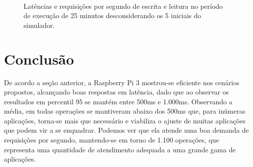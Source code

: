\documentclass[12pt,english,brazil]{article}
\begin{document}
\begin{figure}[!ht]
  \centering
  \mbox{%
    \qquad
    }
  \caption{Latências e requisições por segundo de escrita e leitura no período de execução de 25 minutos desconsiderando os 5 iniciais do simulador.}
  \label{fig:avr-memmap3}
\end{figure}

\section{Conclusão} \label{sec:conlusao}

De acordo a seção anterior, a Raspberry Pi 3 mostrou-se eficiente nos cenários propostos, alcançando boas respostas em latência, dado que ao observar os resultados em percentil 95 se mantém entre 500ms e 1.000ms. Observando a média, em todas operações se mantiveram abaixo dos 500ms que, para inúmeras aplicações, torna-se mais que necessário e viabiliza o ajuste de muitas aplicações que podem vir a se enquadrar. Podemos ver que ela atende uma boa demanda de requisições por segundo, mantendo-se em torno de 1.100 operações, que representa uma quantidade de atendimento adequada a uma grande gama de aplicações.
\end{document}
